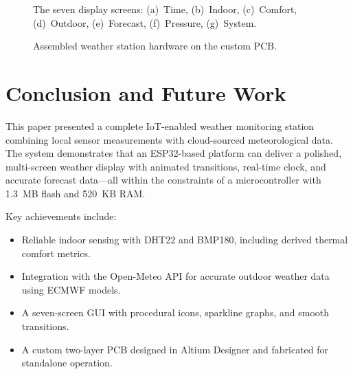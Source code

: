 \documentclass[conference]{IEEEtran}
\begin{document}
\begin{figure}[h]
    \centering
    \caption{The seven display screens: (a)~Time, (b)~Indoor, (c)~Comfort, (d)~Outdoor, (e)~Forecast, (f)~Pressure, (g)~System.}
    \label{fig:display_screens}
\end{figure}

\begin{figure}[h]
    \centering
    \caption{Assembled weather station hardware on the custom PCB.}
    \label{fig:hardware}
\end{figure}

\section{Conclusion and Future Work}

This paper presented a complete IoT-enabled weather monitoring station combining local sensor measurements with cloud-sourced meteorological data. The system demonstrates that an ESP32-based platform can deliver a polished, multi-screen weather display with animated transitions, real-time clock, and accurate forecast data---all within the constraints of a microcontroller with 1.3~MB flash and 520~KB RAM.

Key achievements include:
\begin{itemize}
    \item Reliable indoor sensing with DHT22 and BMP180, including derived thermal comfort metrics.
    \item Integration with the Open-Meteo API for accurate outdoor weather data using ECMWF models.
    \item A seven-screen GUI with procedural icons, sparkline graphs, and smooth transitions.
    \item A custom two-layer PCB designed in Altium Designer and fabricated for standalone operation.
\end{itemize}
\end{document}

